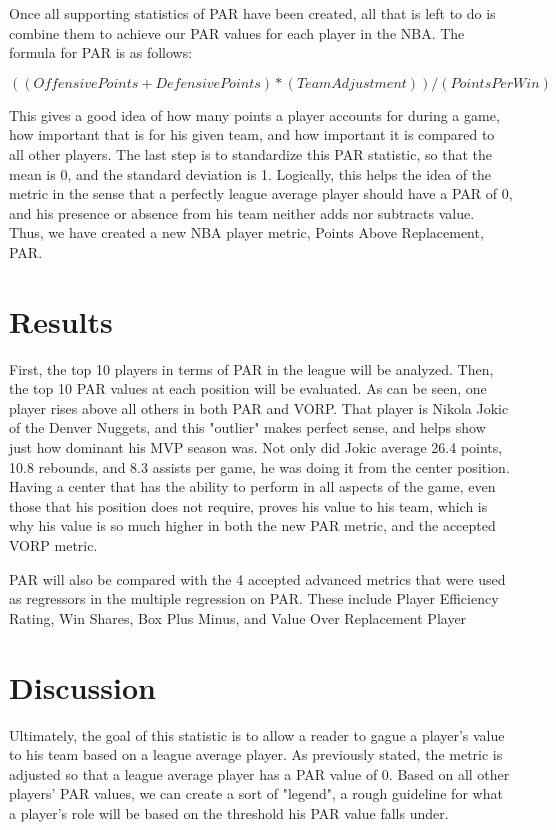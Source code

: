 \documentclass[12pt]{article}
\begin{document}
Once all supporting statistics of PAR have been created, all that is left to do is combine them to achieve our PAR values for each player in the NBA. The formula for PAR is as follows:

\begin{equation}
((Offensive Points + DefensivePoints) * (Team Adjustment))/(Points Per Win)
\end{equation}

This gives a good idea of how many points a player accounts for during a game, how important that is for his given team, and how important it is compared to all other players. The last step is to standardize this PAR statistic, so that the mean is 0, and the 
standard deviation is 1. Logically, this helps the idea of the metric in the sense that a perfectly league average player should have a PAR of 0, and his presence or absence from his team neither adds nor subtracts value. Thus, we have created a new NBA player 
metric, Points Above Replacement, PAR.
 
 
\section{Results}
First, the top 10 players in terms of PAR in the league will be analyzed. Then, the top 10 PAR values at each position will be evaluated.
As can be seen, one player rises above all others in both PAR and VORP. That player is Nikola Jokic of the Denver Nuggets, and this "outlier" makes perfect sense, and helps show just how dominant his MVP season was. Not only did Jokic average 26.4 points, 10.8 rebounds, and 8.3 assists per game, he was doing it from the center position. Having a center that has the ability to perform in all aspects of the game, even those that his position does not require, proves his value to his team, which is why his value is so much higher in both the new PAR metric, and the accepted VORP metric.

PAR will also be compared with the 4 accepted advanced metrics that were used as regressors in the multiple regression on PAR. These include Player Efficiency Rating, Win Shares, Box Plus Minus, and Value Over Replacement Player

\section{Discussion}
Ultimately, the goal of this statistic is to allow a reader to gague a player's value to his team based on a league average player. As previously stated, the metric is adjusted so that a league average player has a PAR value of 0. Based on all other players' PAR values, we can create a sort of "legend", a rough guideline for what a player's role will be based on the threshold his PAR value falls under.
\end{document}
